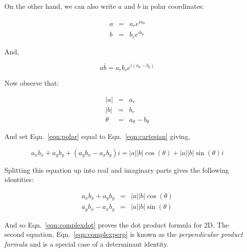 \documentclass{article}[11pt]
\begin{document}
On the other hand, we can also write $a$ and $b$ in polar coordinates:

\begin{eqnarray*}
a & = & a_r e^{i a_\theta} \\
b & = & b_r e^{i b_\theta}
\end{eqnarray*}

And,

\begin{equation}
\label{eqn:polar}
a \overline{b} = a_r b_r e^{i (a_\theta - b_\theta)}
\end{equation}

Now observe that:

\begin{eqnarray*}
|a| & = & a_r \\
|b| & = & b_r \\
\theta & = & a_\theta - b_\theta
\end{eqnarray*}

And set Eqn.~\ref{eqn:polar} equal to Eqn.~\ref{eqn:cartesian} giving,

\begin{equation}
a_x b_x + a_y b_y + (a_y b_x - a_x b_y) i = |a| |b| \cos(\theta) + |a| |b| \sin(\theta) i
\end{equation}

Splitting this equation up into real and imaginary parts gives the following identities:

\begin{eqnarray}
\label{eqn:complexdot} a_x b_x + a_y b_y & = & |a| |b| \cos(\theta) \\
\label{eqn:complexperp} a_y b_x - a_x b_y & = & |a| |b| \sin(\theta)
\end{eqnarray}

And so Eqn.~\ref{eqn:complexdot} proves the dot product formula for 2D.  The second equation, Eqn.~\ref{eqn:complexperp} is known as the \emph{perpendicular product formula} and is a special case of a determinant identity.
\end{document}
